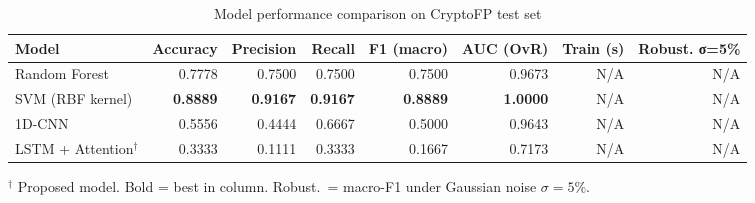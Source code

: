 \begin{table}[htbp]
  \centering
  \caption{Model performance comparison on CryptoFP test set}
  \label{tab:model_comparison}
  \renewcommand{\arraystretch}{1.15}
  \begin{tabular}{lrrrrrrr}
    \toprule
    \textbf{Model} & \textbf{Accuracy} & \textbf{Precision} & \textbf{Recall} & \textbf{F1 (macro)} & \textbf{AUC (OvR)} & \textbf{Train (s)} & \textbf{Robust. σ=5\%} \\
    \midrule
    Random Forest & 0.7778 & 0.7500 & 0.7500 & 0.7500 & 0.9673 & N/A & N/A \\
    SVM (RBF kernel) & \textbf{0.8889} & \textbf{0.9167} & \textbf{0.9167} & \textbf{0.8889} & \textbf{1.0000} & N/A & N/A \\
    \midrule
    1D-CNN & 0.5556 & 0.4444 & 0.6667 & 0.5000 & 0.9643 & N/A & N/A \\
    LSTM + Attention$^\dagger$ & 0.3333 & 0.1111 & 0.3333 & 0.1667 & 0.7173 & N/A & N/A \\
    \bottomrule
  \end{tabular}
  \begin{tablenotes}
    \small \item $^\dagger$ Proposed model. Bold = best in column. Robust.\ = macro-F1 under Gaussian noise $\sigma=5\%$.
  \end{tablenotes}
\end{table}
